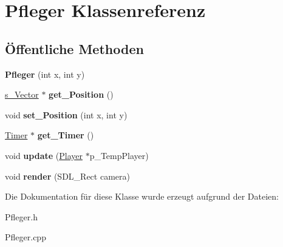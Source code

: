 \hypertarget{class_pfleger}{\section{Pfleger Klassenreferenz}
\label{class_pfleger}
}
\subsection*{Öffentliche Methoden}
\begin{DoxyCompactItemize}
\item 
\hypertarget{class_pfleger_a26093400c124cd80c3905aed358f3613}{{\bfseries Pfleger} (int x, int y)}\label{class_pfleger_a26093400c124cd80c3905aed358f3613}

\item 
\hypertarget{class_pfleger_a8af1eb8290c18f38547cab4182fd9801}{\hyperlink{structs___vector}{s\-\_\-\-Vector} $\ast$ {\bfseries get\-\_\-\-Position} ()}\label{class_pfleger_a8af1eb8290c18f38547cab4182fd9801}

\item 
\hypertarget{class_pfleger_a125d4f58e1d558e3da1632f5b145c981}{void {\bfseries set\-\_\-\-Position} (int x, int y)}\label{class_pfleger_a125d4f58e1d558e3da1632f5b145c981}

\item 
\hypertarget{class_pfleger_aa6c0976c738b053ac48086c47f0ecebb}{\hyperlink{class_timer}{Timer} $\ast$ {\bfseries get\-\_\-\-Timer} ()}\label{class_pfleger_aa6c0976c738b053ac48086c47f0ecebb}

\item 
\hypertarget{class_pfleger_ab16f8907843415401742d8def572da73}{void {\bfseries update} (\hyperlink{class_player}{Player} $\ast$p\-\_\-\-Temp\-Player)}\label{class_pfleger_ab16f8907843415401742d8def572da73}

\item 
\hypertarget{class_pfleger_a4ae72e0182e9d909358755769447681d}{void {\bfseries render} (S\-D\-L\-\_\-\-Rect camera)}\label{class_pfleger_a4ae72e0182e9d909358755769447681d}

\end{DoxyCompactItemize}


Die Dokumentation für diese Klasse wurde erzeugt aufgrund der Dateien\-:\begin{DoxyCompactItemize}
\item 
Pfleger.\-h\item 
Pfleger.\-cpp\end{DoxyCompactItemize}
